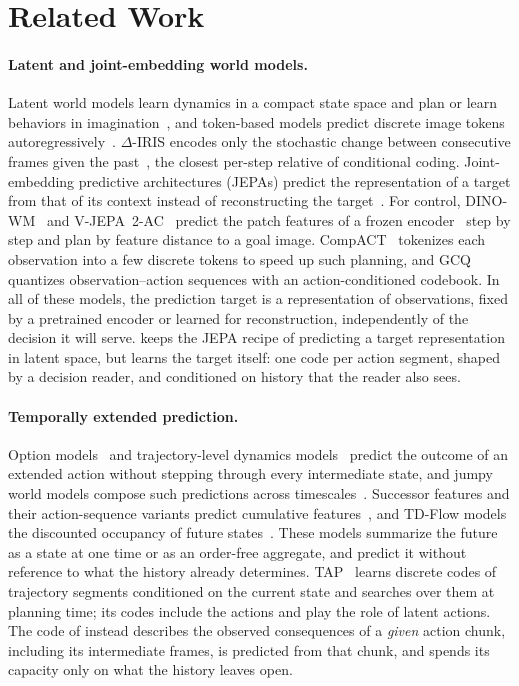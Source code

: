 \section{Related Work}
\label{sec:related}

\paragraph{Latent and joint-embedding world models.}
Latent world models learn dynamics in a compact state space and plan or learn behaviors in imagination~\cite{hafner2019planet,hafner2023dreamerv3,hansen2024tdmpc2}, and token-based models predict discrete image tokens autoregressively~\cite{micheli2023iris}.
$\Delta$-IRIS encodes only the stochastic change between consecutive frames given the past~\cite{micheli2024deltairis}, the closest per-step relative of conditional coding.
Joint-embedding predictive architectures (JEPAs) predict the representation of a target from that of its context instead of reconstructing the target~\cite{lecun2022path,assran2023ijepa,bardes2024vjepa}.
For control, DINO-WM~\cite{zhou2025dinowm} and V-JEPA~2-AC~\cite{assran2025vjepa2} predict the patch features of a frozen encoder~\cite{oquab2024dinov2} step by step and plan by feature distance to a goal image.
CompACT~\cite{kim2026compact} tokenizes each observation into a few discrete tokens to speed up such planning, and GCQ~\cite{peng2025gcq} quantizes observation--action sequences with an action-conditioned codebook.
In all of these models, the prediction target is a representation of observations, fixed by a pretrained encoder or learned for reconstruction, independently of the decision it will serve.
\method keeps the JEPA recipe of predicting a target representation in latent space, but learns the target itself: one code per action segment, shaped by a decision reader, and conditioned on history that the reader also sees.

\paragraph{Temporally extended prediction.}
Option models~\cite{sutton1999options} and trajectory-level dynamics models~\cite{lambert2021longterm,ding2024dwm} predict the outcome of an extended action without stepping through every intermediate state, and jumpy world models compose such predictions across timescales~\cite{farebrother2026jumpy}.
Successor features and their action-sequence variants predict cumulative features~\cite{barreto2017sf,chen2023ramp}, and TD-Flow models the discounted occupancy of future states~\cite{farebrother2025tdflow}.
These models summarize the future as a state at one time or as an order-free aggregate, and predict it without reference to what the history already determines.
TAP~\cite{jiang2023tap} learns discrete codes of trajectory segments conditioned on the current state and searches over them at planning time; its codes include the actions and play the role of latent actions.
The code of \method instead describes the observed consequences of a \emph{given} action chunk, including its intermediate frames, is predicted from that chunk, and spends its capacity only on what the history leaves open.


